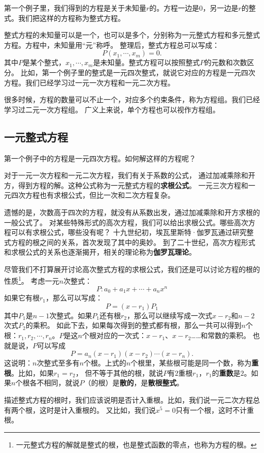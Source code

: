 \documentclass[12pt,UTF8,fontset=none]{ctexbook}
\begin{document}
第一个例子里，我们得到的方程是关于未知量$r$的。方程一边是$0$，另一边是$r$的整式。我们把这样的方程称为整式方程。

整式方程的未知量可以是一个，也可以是多个，分别称为一元整式方程和多元整式方程。方程中，未知量用“元”称呼。
整理后，整式方程总可以写成：
$$ P(x_1, \cdots ,x_m) = 0.$$
其中$P$是某个整式，$x_1, \cdots ,x_m$是未知量。整式方程可以按照整式$P$的元数和次数区分。
比如，第一个例子里的整式是一元四次整式，就说它对应的方程是一元四次方程。我们已经学习过一元一次方程和一元二次方程。

很多时候，方程的数量可以不止一个，对应多个约束条件，称为方程组。我们已经学习过二元一次方程组。
广义上来说，单个方程也可以视作方程组。

\subsection{一元整式方程}

第一个例子中的方程是一元四次方程。如何解这样的方程呢？

对于一元一次方程和一元二次方程，我们有关于系数的公式，
通过加减乘除和开方，得到方程的解。这种公式称为一元整式方程的\textbf{求根公式}。
一元三次方程和一元四次方程也有求根公式，但比一次和二次方程复杂。

遗憾的是，次数高于四次的方程，就没有从系数出发，通过加减乘除和开方求根的一般公式了。
对某些特殊形式的高次方程，我们可以给出求根公式。哪些高次方程可以有求根公式，哪些没有呢？
十九世纪初，埃瓦里斯特·伽罗瓦通过研究整式方程的根之间的关系，首次发现了其中的奥妙。
到了二十世纪，高次方程形式和求根公式的关系也逐渐揭开，相关的理论称为\textbf{伽罗瓦理论}。

尽管我们不打算展开讨论高次整式方程的求根公式，我们还是可以讨论方程的根的性质\footnote{一元整式方程的解就是整式的根，也是整式函数的零点，也称为方程的根。}。
考虑一元$n$次整式：
$$ P: a_0 + a_1 x + \cdots + a_n x^n $$
如果它有根$r_1$，那么可以写成：
$$ P = (x - r_1) P_1$$
其中$P_1$是$n-1$次整式。如果$P_1$还有根$r_2$，那么可以继续写成一次式$x - r_2$和$n-2$次式$P_2$的乘积。
如此下去，如果每次得到的整式都有根，那么一共可以得到$n$个根：$r_1, r_2, \cdots , r_n$。$P$是这$n$个根对应的一次式：$x - r_1$、$x - r_2$……和常数的乘积。
也就是说，$P$可以写成
$$ P = a_n (x - r_1)(x - r_2)\cdots (x - r_n).$$
这说明：$n$次整式至多有$n$个根。上式的$n$个根里，某些根可能是同一个数，称为\textbf{重根}。比如，如果$r_1 = r_2$，
但不等于其他的根，就说$P$有$2$\dash 重根$r_1$，$r_1$的\textbf{重数}是$2$。如果$n$个根各不相同，就说$P$（的根）是\textbf{散的}，是\textbf{散根整式}。

描述整式方程的根时，我们应该说明是否计入重根。比如，我们说一元二次方程总有两个根，这时是计入重根的。
又比如，我们说$x^5 = 0$只有一个根，这时不计重根。
\end{document}
